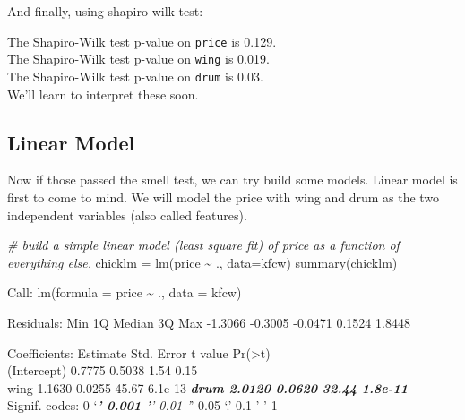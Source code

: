 \documentclass[
]{article}
\newenvironment{Shaded}{\begin{snugshade}}{\end{snugshade}}
\newcommand{\AttributeTok}[1]{\textcolor[rgb]{0.77,0.63,0.00}{#1}}
\newcommand{\CommentTok}[1]{\textcolor[rgb]{0.56,0.35,0.01}{\textit{#1}}}
\newcommand{\FunctionTok}[1]{\textcolor[rgb]{0.00,0.00,0.00}{#1}}
\newcommand{\NormalTok}[1]{#1}
\newcommand{\OtherTok}[1]{\textcolor[rgb]{0.56,0.35,0.01}{#1}}
\newcommand{\SpecialCharTok}[1]{\textcolor[rgb]{0.00,0.00,0.00}{#1}}
\begin{document}
And finally, using shapiro-wilk test:

\begin{Shaded}
\end{Shaded}

The Shapiro-Wilk test p-value on \texttt{price} is 0.129.\\
The Shapiro-Wilk test p-value on \texttt{wing} is 0.019.\\
The Shapiro-Wilk test p-value on \texttt{drum} is 0.03.\\
We'll learn to interpret these soon.

\hypertarget{linear-model}{%
\subsection{Linear Model}\label{linear-model}}

Now if those passed the smell test, we can try build some models. Linear
model is first to come to mind. We will model the price with wing and
drum as the two independent variables (also called features).

\begin{Shaded}
\begin{Highlighting}[]
\CommentTok{\# build a simple linear model (least square fit) of price as a function of everything else.}
\NormalTok{chicklm }\OtherTok{=} \FunctionTok{lm}\NormalTok{(price }\SpecialCharTok{\textasciitilde{}}\NormalTok{ ., }\AttributeTok{data=}\NormalTok{kfcw)}
\FunctionTok{summary}\NormalTok{(chicklm)}
\end{Highlighting}
\end{Shaded}

Call: lm(formula = price \textasciitilde{} ., data = kfcw)

Residuals: Min 1Q Median 3Q Max -1.3066 -0.3005 -0.0471 0.1524 1.8448

Coefficients: Estimate Std. Error t value
Pr(\textgreater\textbar t\textbar)\\
(Intercept) 0.7775 0.5038 1.54 0.15\\
wing 1.1630 0.0255 45.67 6.1e-13 \textbf{\emph{ drum 2.0120 0.0620 32.44
1.8e-11 }} --- Signif. codes: 0 `\emph{\textbf{' 0.001 '}' 0.01 '}' 0.05
`.' 0.1 ' ' 1
\end{document}
